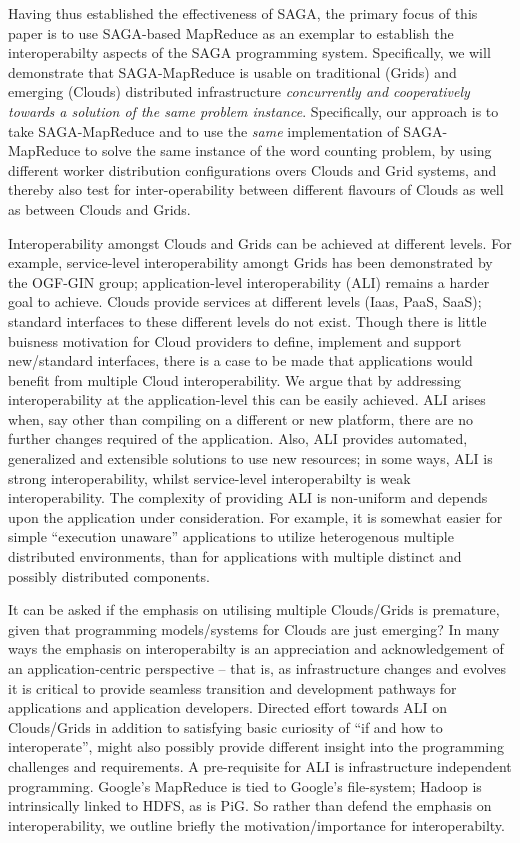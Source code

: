 \documentclass[conference,final]{IEEEtran}
\newcommand{\sagamapreduce }{SAGA-MapReduce }
\begin{document}
Having thus established the effectiveness of SAGA, the primary focus
of this paper is to use SAGA-based MapReduce as an exemplar to
establish the interoperabilty aspects of the SAGA programming system.
Specifically, we will demonstrate that \sagamapreduce is usable on
traditional (Grids) and emerging (Clouds) distributed infrastructure
{\it concurrently and cooperatively towards a solution of the same
  problem instance}.  Specifically, our approach is to take
\sagamapreduce and to use the {\it same} implementation of
\sagamapreduce to solve the same instance of the word counting
problem, by using different worker distribution configurations overs
Clouds and Grid systems, and thereby also test for inter-operability
between different flavours of Clouds as well as between Clouds and
Grids.

Interoperability amongst Clouds and Grids can be achieved at different
levels. For example, service-level interoperability amongt Grids has
been demonstrated by the OGF-GIN group; application-level
interoperability (ALI) remains a harder goal to achieve.  Clouds
provide services at different levels (Iaas, PaaS, SaaS); standard
interfaces to these different levels do not exist. Though there is
little buisness motivation for Cloud providers to define, implement
and support new/standard interfaces, there is a case to be made that
applications would benefit from multiple Cloud interoperability.  We
argue that by addressing interoperability at the application-level
this can be easily achieved.  %
ALI arises when, say other than compiling on a different or new
platform, there are no further changes required of the
application. Also, ALI provides automated, generalized and extensible
solutions to use new resources; in some ways, ALI is strong
interoperability, whilst service-level interoperabilty is weak
interoperability.  The complexity of providing ALI is non-uniform and
depends upon the application under consideration. For example, it is
somewhat easier for simple ``execution unaware'' applications to
utilize heterogenous multiple distributed environments, than for
applications with multiple distinct and possibly distributed
components.

It can be asked if the emphasis on utilising multiple Clouds/Grids is
premature, given that programming models/systems for Clouds are just
emerging? In many ways the emphasis on interoperabilty is an
appreciation and acknowledgement of an application-centric perspective
-- that is, as infrastructure changes and evolves it is critical to
provide seamless transition and development pathways for applications
and application developers. Directed effort towards ALI on
Clouds/Grids in addition to satisfying basic curiosity of ``if and how
to interoperate'', might also possibly provide different insight into
the programming challenges and requirements. A pre-requisite for ALI
is infrastructure independent programming. Google's MapReduce is tied
to Google's file-system; Hadoop is intrinsically linked to HDFS, as is
PiG.  So rather than defend the emphasis on interoperability, we
outline briefly the motivation/importance for interoperabilty. 
\end{document}
